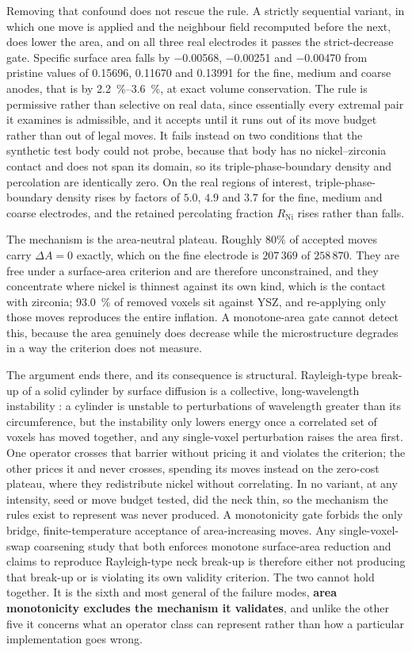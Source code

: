 \documentclass[5p,times,twocolumn]{elsarticle}
\begin{document}
Removing that confound does not rescue the rule. A strictly sequential
variant, in which one move is applied and the neighbour field recomputed before
the next, does lower the area, and on all three real electrodes it passes the
strict-decrease gate. Specific
surface area falls by \num{-0.00568}, \num{-0.00251} and \num{-0.00470} from
pristine values of 0.15696, 0.11670 and 0.13991 for the fine, medium and coarse
anodes, that is by \SIrange{2.2}{3.6}{\percent}, at exact volume conservation.
The rule is permissive rather than selective on real data, since essentially
every
extremal pair it examines is admissible, and it accepts until it runs out of
its move budget rather than out of legal moves. It fails
instead on two conditions that the synthetic test body could not probe, because
that body has no nickel--zirconia contact and does not span its domain, so its
triple-phase-boundary density and percolation are identically zero. On the real
regions of interest, triple-phase-boundary density rises by factors of
$5.0$, $4.9$ and $3.7$ for the fine, medium and coarse electrodes, and the
retained percolating fraction $R_{\mathrm{Ni}}$ rises rather than falls.

The mechanism is the area-neutral plateau. Roughly $80\%$ of accepted moves
carry $\Delta A = 0$ exactly, which on the fine electrode is $207\,369$ of
$258\,870$.
They are free under a surface-area criterion and are therefore unconstrained,
and they concentrate where nickel is thinnest against its own kind, which is
the contact with zirconia; \SI{93.0}{\percent} of removed voxels sit against
YSZ, and re-applying only those moves reproduces the entire inflation. A
monotone-area gate cannot detect this, because the area genuinely does decrease
while the microstructure degrades in a way the criterion does not measure.

The argument ends there, and its consequence is structural.
Rayleigh-type break-up of a solid cylinder by surface diffusion is a
collective, long-wavelength instability \cite{nichols1965}: a cylinder is
unstable to perturbations of wavelength greater than its circumference, but
the instability only lowers energy once a correlated set of voxels has moved
together, and any single-voxel perturbation raises the area first. One
operator crosses that barrier without pricing it and violates the criterion;
the other prices it and never crosses, spending its moves instead on the
zero-cost plateau, where they redistribute nickel without correlating. In no
variant, at any intensity, seed or move budget tested, did the neck thin, so
the
mechanism the rules exist to represent was never produced. A monotonicity gate
forbids the only bridge, finite-temperature acceptance of area-increasing
moves. Any single-voxel-swap coarsening study that both
enforces monotone surface-area reduction and claims to reproduce Rayleigh-type
neck break-up is therefore either not producing that break-up or is violating
its own validity criterion. The two cannot hold together. It is the sixth and most general of the failure modes, \textbf{area
monotonicity excludes the mechanism it validates}, and unlike the other five
it concerns what an operator class can represent rather than how a particular
implementation goes wrong.
\end{document}
